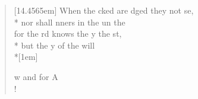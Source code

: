 \begin{flushleft}
\begin{verse}[14.4565em]
 When the cked are dged they  not se,\\*
nor shall nners in the un  the \\
 for the rd knows the y  the st,\\*
but the y of the  will \\*[1em]

w and for  A\\!
\end{verse}
\end{flushleft}
